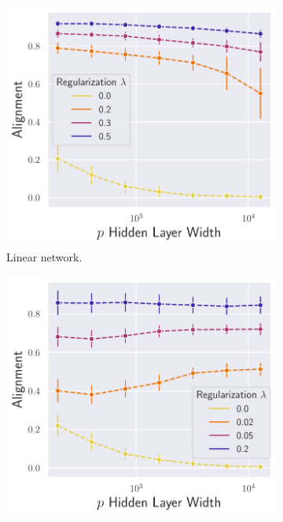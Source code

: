 \begin{figure}[h]
\centering
\begin{subfigure}[b]{.33\textwidth}
  \centering
  \includegraphics[width=\linewidth]{figures/df_lr_non_autograd_l2_v6.pdf}
  \caption{Linear network.}
  \label{fig:align_lr_non_autograd_l2}
\end{subfigure}\hfill
\begin{subfigure}[b]{.33\textwidth}
  \centering
  \includegraphics[width=\linewidth]{figures/df_nn_relu_autograd_l2_v6.pdf}

\end{subfigure}
\end{figure}
